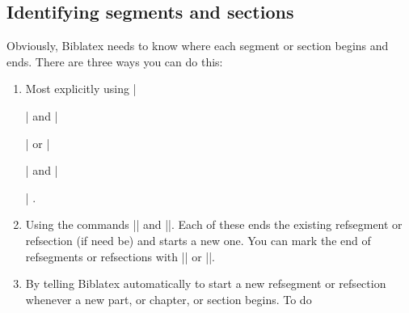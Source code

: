\subsection{Identifying segments and sections}

Obviously, Biblatex needs to know where each segment or section begins
and ends. There are three ways you can do this:

\begin{enumerate}
\item
  \begin{marginfigure}
  \end{marginfigure}
  Most explicitly using
  |\begin{refsection}| and |\end{refsection}|
  or
  |\begin{refsegment}| and |\end{refsegment}|
.
\item
  \begin{marginfigure}
  \end{marginfigure}
  Using the commands |\newrefsection| and |\newrefsegment|. Each of
  these ends the existing refsegment or refsection (if need be) and
  starts a new one. You can mark the end of refsegments or refsections
  with |\endrefsegment| or |\endrefsection|.
\item By telling Biblatex automatically to start a new refsegment or
  refsection whenever a new part, or chapter, or section begins. To do

\end{enumerate}
